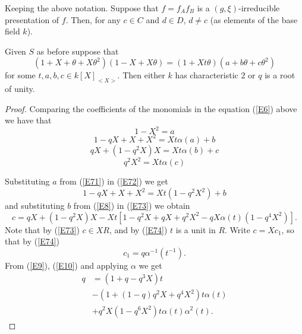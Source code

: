 \documentclass[10pt,a4paper]{amsart}
\begin{document}
 \begin{lemma}\label{irrepresentation} Keeping the above notation. Suppose that $f=f_Af_B$ is a $(g,\xi)$-irreducible  presentation of $f$. Then, for any $c\in C$ and $d\in D$, $d\ne c$ (as elements of the base field $k$).
 \end{lemma}

\begin{lemma}\label{q algebraic} Given $S$ as before suppose that
 \begin{equation}\label{E6}
(1+X+\theta+X\theta^2)(1-X+X\theta)=(1+Xt\theta)(a+b\theta+c\theta^2)
\end{equation}
for some  $t, a,b,c \in k[X]_{<X>}$. Then either $k$ has characteristic $2$ or $q$ is a root of unity.
\end{lemma}

\begin{proof}
Comparing the coefficients of the monomials in the equation (\ref{E6}) above we have that
\begin{equation}\label{E71}
1-X^2=a
\end{equation}
\begin{equation}\label{E72}
1-qX+X+X^2=Xt\alpha(a)+b
\end{equation}
\begin{equation}\label{E73}
qX+(1-q^2X)X=Xt\alpha(b)+c
\end{equation}
\begin{equation}\label{E74}
q^2X^2=Xt\alpha(c)
\end{equation}

Substituting $a$ from (\ref{E71}) in (\ref{E72}) we get
\begin{equation}	\label{E8}
1-qX+X+X^2=Xt(1-q^2X^2)+b
\end{equation}
and substituting $b$ from (\ref{E8}) in  (\ref{E73}) we obtain
\begin{equation}\label{E9}
c=qX+(1-q^2X)X-Xt[1-q^2X+qX+q^2X^2-qX\alpha(t)(1-q^4X^2)].
\end{equation}
Note that by (\ref{E73}) $c\in XR$, and by (\ref{E74}) $t$ is a unit in $R$. Write $c=Xc_1$, so that by (\ref{E74})
\begin{equation}\label{E10}
c_1=q\alpha^{-1}(t^{-1}).
\end{equation}
From (\ref{E9}), (\ref{E10}) and applying $\alpha$ we get
\begin{equation}\label{reduced}
\begin{split}
q&=(1+q-q^3X)t\\&-(1+(1-q)q^2X+q^4X^2)t\alpha(t)\\&+q^2X(1-q^6X^2)t\alpha(t)\alpha^2(t).
\end{split}
\end{equation}


\end{proof}
\end{document}
